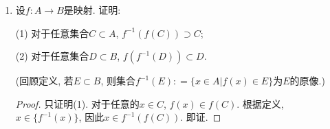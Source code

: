 \documentclass[UTF8,11pt, a4paper, oneside, fontset=none]{ctexbook}
\begin{document}
\begin{enumerate}
\begin{proof}

设函数$f\circ f$有且仅有2个不动点$a, b(a \neq b)$, 且不满足条件(1), 我们来证明只能是条件(2)的情况. 

由于(1)不满足, 因此$f(a) \neq a, f(b) \neq b$. 在$f\circ f(a) = a$两边同时作用$f$, 可得
\[
f\circ f (f(a)) = f(a). 
\]
这说明$f(a)$也是$f \circ f$的不动点. 根据题设, 只能有$f(a) = b$. 同理得$f(b) = a$.

\end{proof}

\item 设$f : A \to B$是映射. 证明:

(1) 对于任意集合$C \subset A$, $f^{-1} (f(C)) \supset C$;

(2) 对于任意集合$D \subset B$, $f(f^{-1} (D)) \subset D$.

(回顾定义, 若$E \subset B$, 则集合$f^{-1}(E) : = \{ x \in A | f(x) \in E \}$为$E$的原像.)

\begin{proof}

只证明(1). 对于任意的$x \in C$, $f(x) \in f(C)$. 根据定义, $x \in \{ f^{-1} (x) \}$, 因此$x \in f^{-1} (f(C))$. 即证.

\end{proof}

\end{enumerate}
\clearpage
\end{document}
